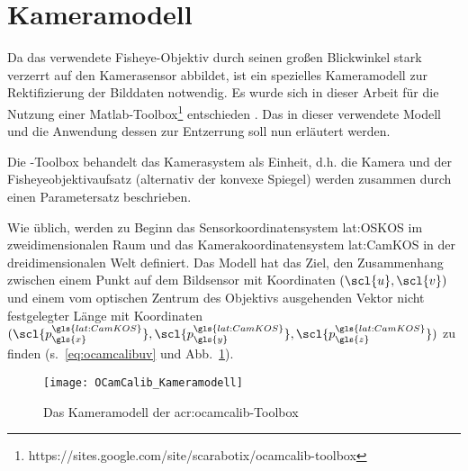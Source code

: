 \section{Kameramodell \dcsecondauthorshort} \label{sec:kameramodell}
Da das verwendete Fisheye-Objektiv durch seinen großen Blickwinkel stark verzerrt auf den Kamerasensor abbildet, ist ein spezielles Kameramodell zur Rektifizierung der Bilddaten notwendig. Es wurde sich in dieser Arbeit für die Nutzung einer Matlab-Toolbox\footnote{https://sites.google.com/site/scarabotix/ocamcalib-toolbox} entschieden  \autocite{scaramuzzaFlexibleTechniqueAccurate2006, scaramuzzaToolboxEasilyCalibrating2006, scaramuzzaOmnidirectionalVisionCalibration2007, rufliAutomaticDetectionCheckerboards2008}. Das in dieser verwendete Modell und die Anwendung dessen zur Entzerrung soll nun erläutert werden. 

Die -Toolbox behandelt das Kamerasystem als Einheit, d.h. die Kamera und der Fisheyeobjektivaufsatz (alternativ der konvexe Spiegel) werden zusammen durch einen Parametersatz beschrieben.

Wie üblich, werden zu Beginn das Sensorkoordinatensystem \gls{lat:OSKOS} im zweidimensionalen Raum und das Kamerakoordinatensystem \gls{lat:CamKOS} in der dreidimensionalen Welt definiert. Das Modell hat das Ziel, den Zusammenhang zwischen einem Punkt auf dem Bildsensor  mit Koordinaten \((\scl{u}, \scl{v})\) und einem vom optischen Zentrum des Objektivs ausgehenden Vektor nicht festgelegter Länge  mit Koordinaten \((\scl{p^{\gls{lat:CamKOS}}_{\gls{x}}}, \scl{p^{\gls{lat:CamKOS}}_{\gls{y}}}, \scl{p^{\gls{lat:CamKOS}}_{\gls{z}}})\) zu finden (s.~\eqref{eq:ocamcalibuv} und Abb.~\ref{fig:kameramodell}).

\begin{figure}[htbp]
  \centering
  \texttt{[image: OCamCalib\_Kameramodell]}
  \caption{Das Kameramodell der \gls{acr:ocamcalib}-Toolbox}
  \label{fig:kameramodell}
\end{figure}

